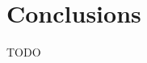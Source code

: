 \documentclass[../xlapes02]{subfiles}
\begin{document}
    \chapter{Conclusions}\label{sec:conclusions}
    TODO
\end{document}
